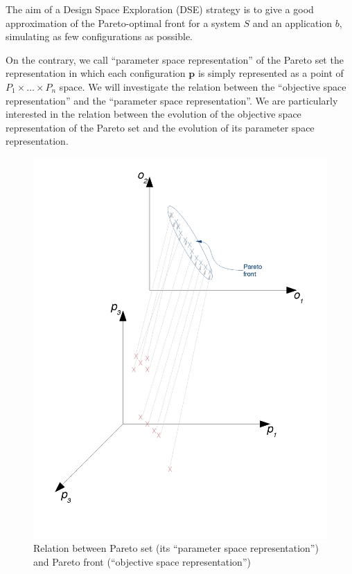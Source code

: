 The aim of a Design Space Exploration (DSE) strategy is to give a
good approximation of the Pareto-optimal front for a system $S$ and an
application $b$, simulating as few configurations as possible.




On the contrary, we call ``parameter space representation'' of the
Pareto set the representation in which each configuration $\mathbf{p}$
is simply represented as a point of $P_{1}\times\dots\times P_{n}$
space. We will investigate the relation between the ``objective space
representation'' and the ``parameter space representation''. We
are particularly interested in the relation between the evolution
of the objective space representation of the Pareto set and the evolution
of its parameter space representation.

\begin{figure}[h]
\includegraphics[width=0.9\columnwidth]{img/Pareto_set_and_front}
\caption{Relation between Pareto set (its ``parameter space representation'')
and Pareto front (``objective space representation'')}
\end{figure}


